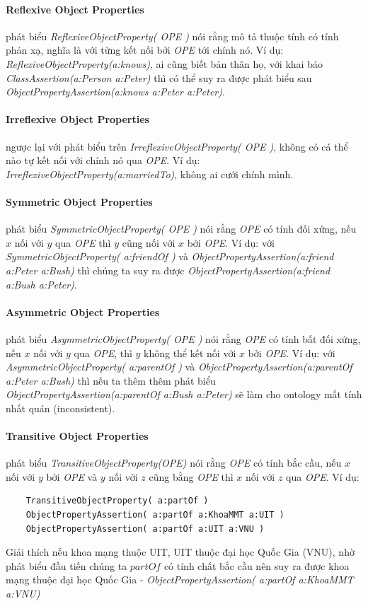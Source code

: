 \paragraph{Reflexive Object Properties} phát biểu \textit{ReflexiveObjectProperty( OPE )} nói rằng mô tả thuộc tính có tính phản xạ, nghĩa là với từng kết nối bởi \textit{OPE} tới chính nó. Ví dụ: \textit{ReflexiveObjectProperty(a:knows)}, ai cũng biết bản thân họ, với khai báo \textit{ClassAssertion(a:Person a:Peter)} thì có thể suy ra được phát biểu sau \textit{ObjectPropertyAssertion(a:knows a:Peter a:Peter)}.

\paragraph{Irreflexive Object Properties} ngược lại với phát biểu trên  \textit{IrreflexiveObjectProperty( OPE )}, không có cá thể nào tự kết nối với chính nó qua \textit{OPE}. Ví dụ: \textit{IrreflexiveObjectProperty(a:marriedTo)}, không ai cưới chính mình.

\paragraph{Symmetric Object Properties} phát biểu \textit{SymmetricObjectProperty( OPE )} nói rằng \textit{OPE} có tính đối xứng, nếu $x$ nối với $y$ qua \textit{OPE} thì $y$ cũng nối với $x$ bởi \textit{OPE}. Ví dụ: với\textit{ SymmetricObjectProperty( a:friendOf )} và \textit{ObjectPropertyAssertion(a:friend a:Peter a:Bush)} thì chúng ta suy ra được \textit{ObjectPropertyAssertion(a:friend a:Bush a:Peter)}.

\paragraph{Asymmetric Object Properties} phát biểu \textit{AsymmetricObjectProperty( OPE )} nói rằng \textit{OPE} có tính bất đối xứng, nếu $x$ nối với $y$ qua \textit{OPE}, thì $y$ không thể kết nối với $x$ bởi \textit{OPE}. Ví dụ: với \textit{AsymmetricObjectProperty( a:parentOf )}  và \textit{ObjectPropertyAssertion(a:parentOf a:Peter a:Bush)} thì nếu ta thêm thêm phát biểu \textit{ObjectPropertyAssertion(a:parentOf a:Bush a:Peter)} sẽ làm cho ontology mất tính nhất quán (inconsistent).

\paragraph{Transitive Object Properties} phát biểu \textit{TransitiveObjectProperty(OPE)} nói rằng \textit{OPE} có tính bắc cầu, nếu $x$ nối với $y$ bởi \textit{OPE} và $y$ nối với $z$ cũng bằng \textit{OPE} thì $x$ nối với $z$ qua \textit{OPE}. Ví dụ:
\begin{verbatim}
	TransitiveObjectProperty( a:partOf ) 
	ObjectPropertyAssertion( a:partOf a:KhoaMMT a:UIT )
	ObjectPropertyAssertion( a:partOf a:UIT a:VNU )
\end{verbatim}
Giải thích nếu khoa mạng thuộc UIT, UIT thuộc đại học Quốc Gia (VNU), nhờ phát biểu đầu tiến chúng ta $partOf$ có tính chất bắc cầu nên suy ra được khoa mạng thuộc đại học Quốc Gia - \textit{ObjectPropertyAssertion( a:partOf a:KhoaMMT a:VNU)}

